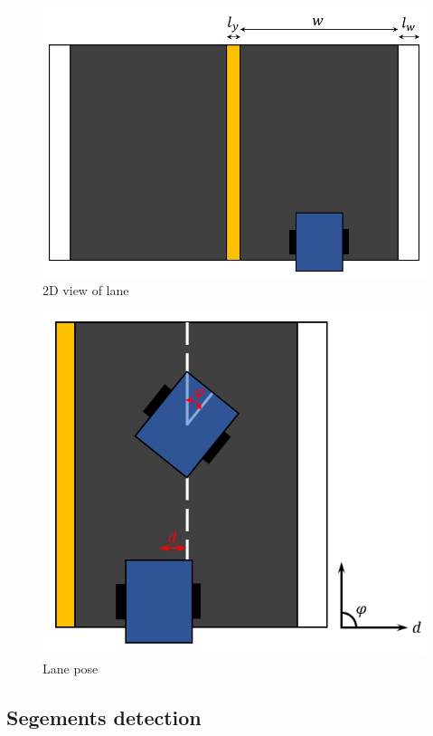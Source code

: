 \documentclass{article}
\begin{document}
\begin{figure}[ht]
  \label{fig:lane_2d_view}
  \centering
  \includegraphics[scale=0.6]{graphs/lane_parameter_2d_view.PNG}
  \caption{2D view of lane}
\end{figure}
\FloatBarrier

\begin{figure}[ht]
  \label{fig:lane_pose}
  \centering
  \includegraphics[scale=0.7]{graphs/lane_pose.PNG}
  \caption{Lane pose}
\end{figure}
\FloatBarrier

\subsection{Segements detection}
\end{document}
